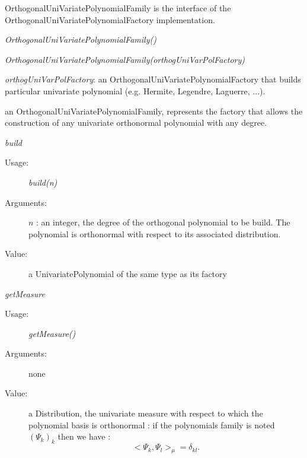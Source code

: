 OrthogonalUniVariatePolynomialFamily is the interface of the OrthogonalUniVariatePolynomialFactory implementation.
\begin{description}
\item[Usage:] \rule{0pt}{1em}
\begin{description}
\item \textit{OrthogonalUniVariatePolynomialFamily()}
\item \textit{OrthogonalUniVariatePolynomialFamily(orthogUniVarPolFactory)}
\end{description}

\item[Arguments:]  \rule{0pt}{1em}
\begin{description}
\item \textit{orthogUniVarPolFactory}: an OrthogonalUniVariatePolynomialFactory that builds particular univariate polynomial (e.g. Hermite, Legendre, Laguerre, ...).
\end{description}

\item[Value:]  an OrthogonalUniVariatePolynomialFamily, represents the factory that allows the construction of any univariate orthonormal polynomial with any degree.

\item[Some methods :]  \rule{0pt}{1em}

\begin{description}

\item \textit{build}
\begin{description}
\item[Usage:] \textit{build(n)}
\item[Arguments:] $n$ : an integer, the degree of the orthogonal polynomial to be build. The polynomial is orthonormal with respect to its associated distribution.
\item[Value:]  a UnivariatePolynomial of the same type as its factory
\end{description}
\bigskip

\item \textit{getMeasure}
\begin{description}
\item[Usage:] \textit{getMeasure()}
\item[Arguments:] none
\item[Value:]  a Distribution, the univariate measure with respect to which the polynomial basis is orthonormal : if the polynomials family is noted $(\Psi_k)_k$ then we have :
\begin{equation}\label{orthono}
<\Psi_k, \Psi_l>_{\mu}  = \delta_{kl}.
\end{equation}
\end{description}
\bigskip


\end{description}
\end{description}
